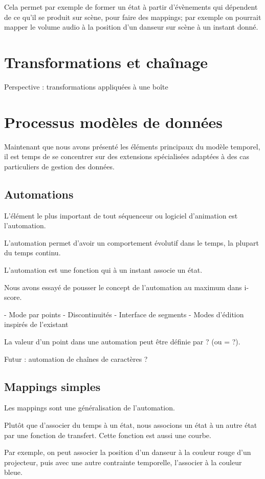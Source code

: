 \documentclass{sigchi}
\begin{document}
Cela permet par exemple de former un état à partir d'évènements qui dépendent de ce qu'il se produit sur scène, pour faire des mappings; par exemple on pourrait mapper le volume audio à la position d'un danseur sur scène à un instant donné.

\section{Transformations et chaînage}
Perspective : transformations appliquées à une boîte

\section{Processus modèles de données}
Maintenant que nous avons présenté les éléments principaux du modèle temporel, il est temps de se concentrer sur des extensions spécialisées adaptées à des cas particuliers de gestion des données.

\subsection{Automations}
L'élément le plus important de tout séquenceur ou logiciel d'animation est l'automation.

L'automation permet d'avoir un comportement évolutif dans le temps, la plupart du temps continu.

L'automation est une fonction qui à un instant associe un état.

Nous avons essayé de pousser le concept de l'automation au maximum dans i-score.

- Mode par points
- Discontinuités
- Interface de segments
- Modes d'édition inspirés de l'existant

La valeur d'un point dans une automation peut être définie par ? (ou = ?).

Futur : automation de chaînes de caractères ?

\subsection{Mappings simples}
Les mappings sont une généralisation de l'automation.

Plutôt que d'associer du temps à un état, nous associons un état à un autre état par une fonction de transfert. Cette fonction est aussi une courbe.

Par exemple, on peut associer la position d'un danseur à la couleur rouge d'un projecteur, puis avec une autre contrainte temporelle, l'associer à la couleur bleue.
\end{document}
